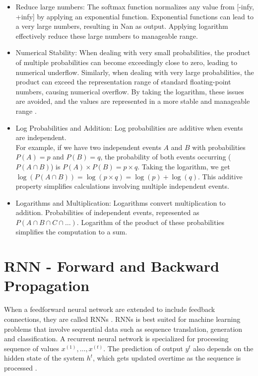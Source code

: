 \begin{itemize}
    \item Reduce large numbers:  The softmax function normalizes any value from [-infy, +infy] by applying an exponential function. Exponential functions can lead to a very large numbers, resulting in  Nan as output. Applying logarithm effectively reduce these large numbers to manageable range.
    \item Numerical Stability: When dealing with very small probabilities, the product of multiple probabilities can become exceedingly close to zero, leading to numerical underflow. Similarly, when dealing with very large probabilities, the product can exceed the representation range of standard floating-point numbers, causing numerical overflow. By taking the logarithm, these issues are avoided, and the values are represented in a more stable and manageable range \parencite[Page 79]{Goodfellow-et-al-2016}.
    
    \item Log Probabilities and Addition: Log probabilities are additive when events are independent.\\ For example, if we have two independent events \(A\) and \(B\) with probabilities \(P(A) = p\) and \(P(B) = q\), the probability of both events occurring (\(P(A \cap B)\)) is \(P(A) \times P(B) = p \times q\). Taking the logarithm, we get \(\log(P(A \cap B)) = \log(p \times q) = \log(p) + \log(q)\). This additive property simplifies calculations involving multiple independent events.

    \item Logarithms and Multiplication: Logarithms convert multiplication to addition. Probabilities of independent events,  represented as \(P(A \cap B \cap C \cap \ldots)\). Logarithm of the product of these probabilities simplifies the computation to a sum. 
\end{itemize}

\section{ \acs*{RNN} - Forward and Backward Propagation} \label{sec:math-rnn}

When a feedforward neural network are extended to include feedback connections, they are called \acfp{RNN} \parencite[Chapter 6, Page 164]{Goodfellow-et-al-2016}. \acfp{RNN} is best suited for machine learning problems that involve sequential data such as sequence translation, generation and classification. A recurrent neural network is specialized for processing sequence of values $ x^{(1)},\ldots,x^{(t)}$. The prediction of output $y^t$ also depends on the hidden state of the system $h^t$, which gets updated overtime as the sequence is processed \parencite[Chapter 15, Page 501]{pml1Book}.

